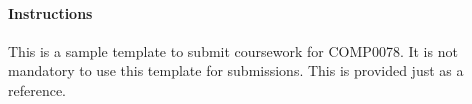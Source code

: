 \documentclass[12pt]{report}
\begin{document}
\maketitle

\paragraph{Instructions} This is a sample template to submit coursework for COMP0078. It is not mandatory to use this template for submissions. This is provided just as a reference. 
\end{document}
